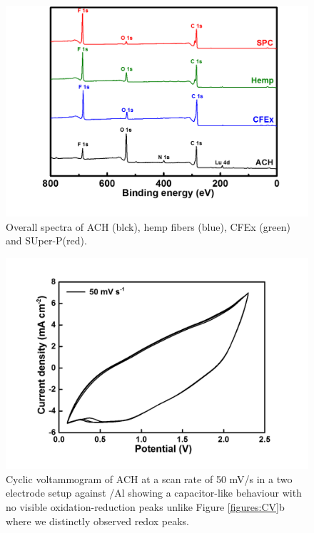 \begin{figure}[tbh!]
  \centering
  \includegraphics[width=\textwidth]{SF/XPSoverall}
    \caption{Overall spectra of ACH (blck), hemp fibers (blue), CFEx (green) and SUper-P(red).}
  \label{SF:XPSoverall}
\end{figure}
\begin{figure}[tbh!]
  \centering
  \includegraphics[width=\textwidth]{SF/hair50mVs}
    \caption{Cyclic voltammogram of ACH at a scan rate of 50 mV/s in a two electrode setup against /Al showing a capacitor-like behaviour with no visible oxidation-reduction peaks unlike Figure \ref{figures:CV}b where we distinctly observed redox peaks.}
  \label{SF:hair50mVs}
\end{figure}
